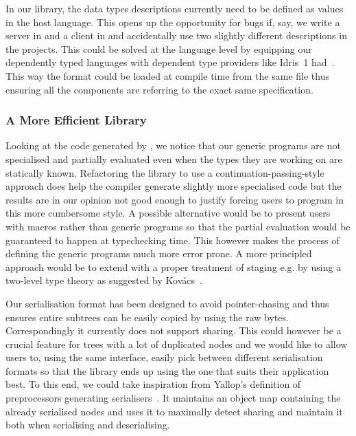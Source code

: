 In our library, the data types descriptions currently need to be defined
as values in the host language.
%
This opens up the opportunity for bugs if, say, we write a server in
\idris{} and a client in \agda{} and accidentally use two slightly
different descriptions in the projects.
%
This could be solved at the language level by equipping our dependently typed
languages with dependent type providers like Idris~1
had~\citep{DBLP:conf/icfp/Christiansen13}.
%
This way the format could be loaded at compile time from the same file thus
ensuring all the components are referring to the exact same specification.


\subsubsection{A More Efficient Library}

Looking at the code generated by \idris{}, we notice that our generic programs
are not specialised and partially evaluated even when the types they are working
on are statically known.
%
Refactoring the library to use a continuation-passing-style approach does help
the compiler generate slightly more specialised code but the results are in our
opinion not good enough to justify forcing users to program in this more
cumbersome style.
%
A possible alternative would be to present users with macros rather than
generic programs so that the partial evaluation would be guaranteed to
happen at typechecking time. This however makes the process of defining
the generic programs much more error prone.
%
A more principled approach would be to extend \idris{} with a proper
treatment of staging e.g. by using a two-level type theory as suggested
by Kov{\'{a}}cs~\citeyearpar{DBLP:journals/pacmpl/Kovacs22}.

Our serialisation format has been designed to avoid pointer-chasing and
thus ensures entire subtrees can be easily copied by using the raw bytes.
Correspondingly it currently does not support sharing.
%
This could however be a crucial feature for trees with a lot of duplicated
nodes and we would like to allow users to, using the same interface,
easily pick between different serialisation formats so that the library
ends up using the one that suits their application best.
%
To this end, we could take inspiration from Yallop's
definition of preprocessors generating serialisers~\citep{DBLP:conf/ml/Yallop07}.
It maintains an object map containing the already serialised nodes and uses it
to maximally detect sharing and maintain it both when serialising and deserialising.


